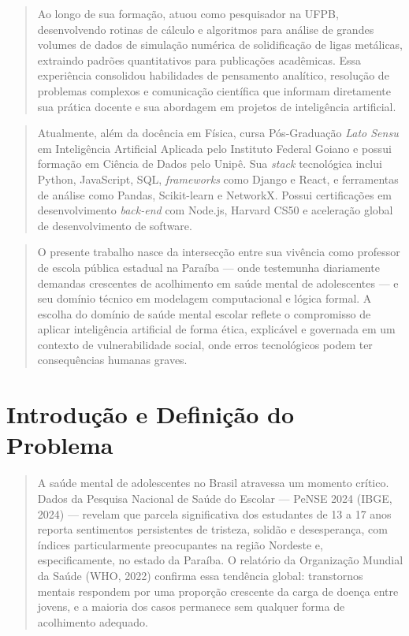 \documentclass[11pt]{article}
\begin{document}
\begin{quote}
Ao longo de sua formação, atuou como pesquisador na UFPB, desenvolvendo
rotinas de cálculo e algoritmos para análise de grandes volumes de dados
de simulação numérica de solidificação de ligas metálicas, extraindo
padrões quantitativos para publicações acadêmicas. Essa experiência
consolidou habilidades de pensamento analítico, resolução de problemas
complexos e comunicação científica que informam diretamente sua prática
docente e sua abordagem em projetos de inteligência artificial.
\end{quote}

\begin{quote}
Atualmente, além da docência em Física, cursa Pós-Graduação \emph{Lato
Sensu} em Inteligência Artificial Aplicada pelo Instituto Federal Goiano
e possui formação em Ciência de Dados pelo Unipê. Sua \emph{stack}
tecnológica inclui Python, JavaScript, SQL, \emph{frameworks} como
Django e React, e ferramentas de análise como Pandas, Scikit-learn e
NetworkX. Possui certificações em desenvolvimento \emph{back-end} com
Node.js, Harvard CS50 e aceleração global de desenvolvimento de
software.
\end{quote}

\begin{quote}
O presente trabalho nasce da intersecção entre sua vivência como
professor de escola pública estadual na Paraíba --- onde testemunha
diariamente demandas crescentes de acolhimento em saúde mental de
adolescentes --- e seu domínio técnico em modelagem computacional e
lógica formal. A escolha do domínio de saúde mental escolar reflete o
compromisso de aplicar inteligência artificial de forma ética,
explicável e governada em um contexto de vulnerabilidade social, onde
erros tecnológicos podem ter consequências humanas graves.
\end{quote}

    \section{Introdução e Definição do
Problema}\label{introduuxe7uxe3o-e-definiuxe7uxe3o-do-problema}

\begin{quote}
A saúde mental de adolescentes no Brasil atravessa um momento crítico.
Dados da Pesquisa Nacional de Saúde do Escolar --- PeNSE 2024 (IBGE,
2024) --- revelam que parcela significativa dos estudantes de 13 a 17
anos reporta sentimentos persistentes de tristeza, solidão e
desesperança, com índices particularmente preocupantes na região
Nordeste e, especificamente, no estado da Paraíba. O relatório da
Organização Mundial da Saúde (WHO, 2022) confirma essa tendência global:
transtornos mentais respondem por uma proporção crescente da carga de
doença entre jovens, e a maioria dos casos permanece sem qualquer forma
de acolhimento adequado.
\end{quote}
\end{document}
